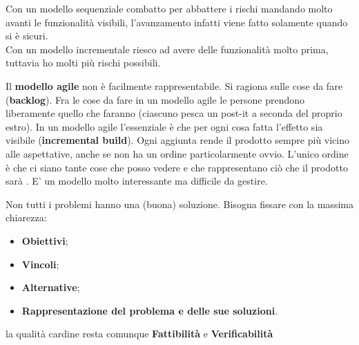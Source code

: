 Con un modello sequenziale combatto per abbattere i rischi mandando molto avanti le funzionalità visibili, l'avanzamento infatti viene fatto solamente quando si è sicuri.\\
Con un modello incrementale riesco ad avere delle funzionalità molto prima, tuttavia ho molti più rischi possibili.

Il \textbf{modello agile} non è facilmente rappresentabile. Si ragiona sulle cose da fare (\textbf{backlog}). Fra le cose da fare in un modello agile le persone prendono liberamente quello che faranno (ciascuno pesca un post-it a seconda del proprio estro). In un modello agile l'essenziale è che per ogni cosa fatta l'effetto sia visibile (\textbf{incremental build}). Ogni aggiunta rende il prodotto sempre più vicino alle aspettative, anche se non ha un ordine particolarmente ovvio. L'unico ordine è che ci siano tante cose che posso vedere e che rappresentano ciò che il prodotto sarà . E' un modello molto interessante ma difficile da gestire.

Non tutti i problemi hanno una (buona) soluzione. Bisogna fissare con la massima chiarezza:

\begin{itemize}

	\item \textbf{Obiettivi};
	\item \textbf{Vincoli};
	\item \textbf{Alternative};
	\item \textbf{Rappresentazione del problema e delle sue soluzioni}.

\end{itemize}
la qualità cardine resta comunque \textbf{Fattibilità} e \textbf{Verificabilità}

